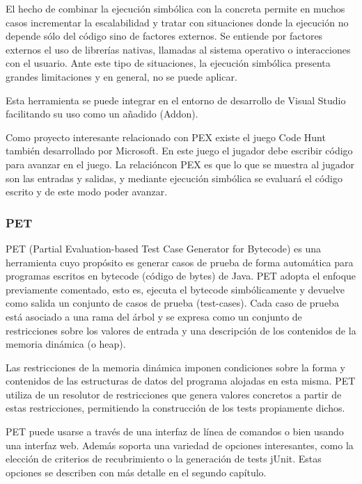 El hecho de combinar la ejecuci\'on simb\'olica con la concreta permite en muchos casos incrementar la escalabilidad y tratar con situaciones donde la ejecuci\'on no depende s\'olo del c\'odigo sino de factores externos. Se entiende por factores externos el uso de librer\'ias nativas, llamadas al sistema operativo o interacciones con el usuario. Ante este tipo de situaciones, la ejecuci\'on simb\'olica presenta grandes limitaciones y en general, no se puede aplicar.

Esta herramienta se puede integrar en el entorno de desarrollo de Visual Studio facilitando su uso como un a\~nadido (Add\-on).

Como proyecto interesante relacionado con PEX existe el juego Code Hunt tambi\'en desarrollado por Microsoft. En este juego el jugador debe escribir c\'odigo para avanzar en el juego. La relaci\'oncon PEX es que lo que se muestra al jugador son las entradas y salidas, y mediante ejecuci\'on simb\'olica se evaluar\'a el c\'odigo escrito y de este modo poder avanzar.

\subsubsection{PET}

PET (Partial Evaluation-based Test Case Generator for Bytecode) es una herramienta cuyo prop\'osito es generar casos de prueba de forma autom\'atica para programas escritos en bytecode (c\'odigo de bytes) de Java. PET adopta el enfoque previamente comentado, esto es, ejecuta el bytecode simb\'olicamente y devuelve como salida un conjunto de casos de prueba (test-cases). Cada caso de prueba est\'a asociado a una rama del \'arbol y se expresa como un conjunto de restricciones sobre los valores de entrada y una descripci\'on de los contenidos de la memoria din\'amica (o heap).

Las restricciones de la memoria din\'amica imponen condiciones sobre la forma y contenidos de las estructuras de datos del programa alojadas en esta misma. PET utiliza de un resolutor de restricciones que genera valores concretos a partir de estas restricciones, permitiendo la construcci\'on de los
tests propiamente dichos.

PET puede usarse a trav\'es de una interfaz de l\'inea de comandos o bien usando una interfaz web. Adem\'as soporta una variedad de opciones interesantes, como la elecci\'on de criterios de recubrimiento o la generaci\'on de tests jUnit. Estas opciones se describen con m\'as detalle en el segundo cap\'itulo.

